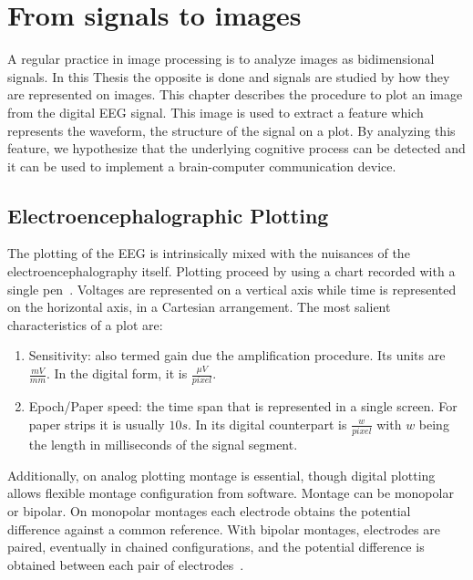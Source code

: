 \chapter{From signals to images}
\label{chapter:two}


A regular practice in image processing is to analyze images as bidimensional signals.  In this Thesis the opposite is done and signals are studied by how they are represented on images. This chapter describes the procedure to plot an image from the digital EEG signal.  This image is used to extract a feature which represents the waveform, the structure of the signal on a plot.  By analyzing this feature, we hypothesize that the underlying cognitive process can be detected and it can be used to implement a brain-computer communication device.

\section{Electroencephalographic Plotting}

The plotting of the EEG is intrinsically mixed with the nuisances of the electroencephalography itself.  Plotting proceed by using a chart recorded with a single pen~\cite{Jestico1977}.   Voltages are represented on a vertical axis while time is represented on the horizontal axis, in a Cartesian arrangement.  The most salient characteristics of a plot are:

\begin{enumerate}
\item Sensitivity: also termed gain due the amplification procedure.  Its units are $ \frac{mV}{mm}$.  In the digital form, it is $\frac{\mu V}{pixel}$.
\item Epoch/Paper speed: the time span that is represented in a single screen.  For paper strips it is usually $10s$.  In its digital counterpart is $ \frac{w}{pixel}$ with $w$ being the length in milliseconds of the signal segment.
\end{enumerate}

Additionally, on analog plotting montage is essential, though digital plotting allows flexible montage configuration from software.  Montage can be monopolar or bipolar.  On monopolar montages each electrode obtains the potential difference against a common reference. With bipolar montages, electrodes are paired, eventually in chained configurations, and the potential difference is obtained between each pair of electrodes~\cite{EEGIntro}.

